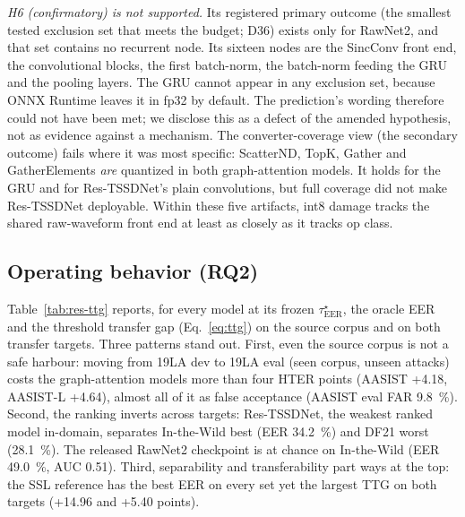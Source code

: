 \documentclass[journal]{IEEEtran}
\newcommand{\eer}{\mathrm{EER}}
\newcommand{\taustar}{\tau^{\star}}
\begin{document}
\emph{H6 (confirmatory) is not supported.} Its registered primary outcome
(the smallest tested exclusion set that meets the budget; D36) exists only for
RawNet2, and that set contains no recurrent node. Its sixteen nodes are the
SincConv front end, the convolutional blocks, the first batch-norm, the
batch-norm feeding the GRU and the pooling layers. The GRU cannot appear in any
exclusion set, because ONNX Runtime leaves it in fp32 by default. The
prediction's wording therefore could not have been met; we disclose this as a
defect of the amended hypothesis, not as evidence against a mechanism. The
converter-coverage view (the secondary outcome) fails where it was most
specific: ScatterND, TopK, Gather and GatherElements \emph{are} quantized in
both graph-attention models. It holds for the GRU and for Res-TSSDNet's plain
convolutions, but full coverage did not make Res-TSSDNet deployable. Within
these five artifacts, int8 damage tracks the shared raw-waveform front end at
least as closely as it tracks op class.

\subsection{Operating behavior (RQ2)}
\label{sec:res-opbehav}
Table~\ref{tab:res-ttg} reports, for every model at its frozen
\(\taustar_{\eer}\), the oracle EER and the threshold transfer gap
(Eq.~\ref{eq:ttg}) on the source corpus and on both transfer targets.
Three patterns stand out. First, even the source corpus is not a safe
harbour: moving from 19LA dev to 19LA eval (seen corpus, unseen attacks) costs
the graph-attention models more than four HTER points (AASIST +4.18, AASIST-L
+4.64), almost all of it as false acceptance (AASIST eval FAR
\SI{9.8}{\percent}). Second, the ranking inverts across targets:
Res-TSSDNet, the weakest ranked model in-domain, separates In-the-Wild best
(EER \SI{34.2}{\percent}) and DF21 worst (\SI{28.1}{\percent}). The released
RawNet2 checkpoint is at chance on In-the-Wild (EER \SI{49.0}{\percent},
AUC 0.51). Third, separability and transferability part ways at the top: the
SSL reference has the best EER on every set yet the largest TTG on both
targets (+14.96 and +5.40 points).
\end{document}
